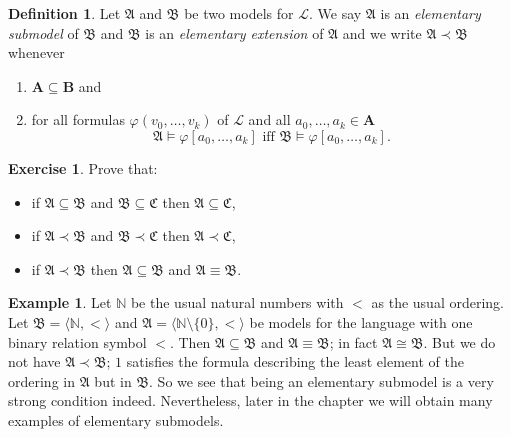 \documentclass[titlepage, oneside]{amsbook}
\theoremstyle{plain}
\theoremstyle{definition}
\newtheorem{exercise}{Exercise}
\newtheorem{examples}{Example}
\newtheorem{definition}{Definition}
\theoremstyle{remark}
\newcommand{\seq}{\ensuremath{\subseteq}}
\newcommand{\ma}{\ensuremath{\mathfrak{A}}}
\newcommand{\mb}{\ensuremath{\mathfrak{B}}}
\newcommand{\mc}{\ensuremath{\mathfrak{C}}}
\newcommand{\ba}{\ensuremath{\mathbf{A}}}
\newcommand{\bb}{\ensuremath{\mathbf{B}}}
\begin{document}
\begin{definition}
%
%
\index{$\prec$}%
 Let $\mathfrak{A}$ and $\mathfrak{B}$ be
two models 
for $\mathcal{L}$. We say $\mathfrak{A}$ is an \emph{elementary 
submodel} of $\mathfrak{B}$ and $\mathfrak{B}$ is an \emph{elementary 
extension} of $\mathfrak{A}$ and we write $\mathfrak{A} \prec 
\mathfrak{B}$ whenever
\begin{enumerate}
\item $\ba \subseteq \bb$ and
\item for all formulas $\varphi (v_{0}, \dots, v_{k}) $ of $\mathcal{L}$ 
and all $a_{0}, \dots , a_{k} \in \mathbf{A}$ \[ \mathfrak{A} \models 
\varphi [a_{0}, \dots, a_{k}] \mbox{ iff } \mathfrak{B} \models \varphi 
[a_{0}, \dots ,a_{k}]. \]
\end{enumerate}
 \end{definition}

\begin{exercise} Prove that: 
\begin{itemize} 
\item  if $\ma \seq \mb$ and $\mb \seq \mc$ then $\ma \seq \mc $, 
\item if  $\ma \prec \mb$ and $\mb \prec \mc$ then $\ma \prec \mc$,
\item if $\ma \prec \mb$ then $\ma \seq \mb$ and $\ma \equiv \mb$.
\end{itemize}
\end{exercise}

\begin{examples}
 Let $\mathbb N$ be the usual natural numbers with
$\pmb{<}$ as
the usual ordering.  Let $\mb = \langle \mathbb N ,\pmb{ <} \rangle$
and $\ma
= \langle \mathbb N \setminus \{ 0 \} ,\pmb{ <} \rangle$ be models for
the
language with one binary relation symbol $<$.  Then $\ma \seq \mb$ and
$\ma \equiv \mb$; in fact $\ma \cong \mb$.  But we do not have $\ma
\prec \mb$; $1$ satisfies the formula describing the least element of the ordering in $\ma$ but in $\mb$. So we see that being an elementary submodel is a very strong
condition indeed.  Nevertheless, later in the chapter we will obtain
many examples of elementary submodels. \end{examples}
\end{document}
